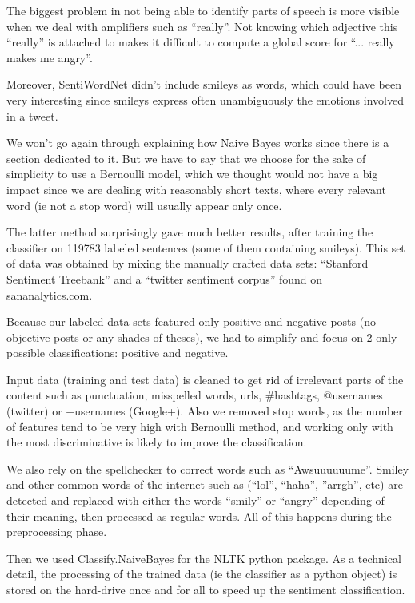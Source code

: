 The biggest problem in not being able to identify parts of speech is more visible when we deal with amplifiers
such as “really”. Not knowing which adjective this “really” is attached to makes it difficult to compute a global score for “... really makes me angry”.

Moreover, SentiWordNet didn’t include smileys as words, which could have been very interesting since smileys
express often unambiguously the emotions involved in a tweet.

We won’t go again through explaining how Naive Bayes works since there is a section dedicated to it. But we have
to say that we choose for the sake of simplicity to use a Bernoulli model, which we thought would not have a big
impact since we are dealing with reasonably short texts, where every relevant word (ie not a stop word) will usually appear only once.

The latter method surprisingly gave much better results, after training the classifier on 119783 labeled
sentences (some of them containing smileys). This set of data was obtained by mixing the manually crafted data sets:
“Stanford Sentiment Treebank” and a “twitter sentiment corpus” found on sananalytics.com.

Because our labeled data sets featured only positive and negative posts (no objective posts or any shades of theses),
we had to simplify and focus on 2 only possible classifications: positive and negative.

Input data (training and test data) is cleaned to get rid of irrelevant parts of the content such as punctuation,
misspelled words, urls, \#hashtags, @usernames (twitter) or +usernames (Google+). Also we removed stop words, as the
number of features tend to be very high with Bernoulli method, and working only with the most discriminative is likely
to improve the classification.

We also rely on the spellchecker to correct words such as “Awsuuuuuume”. Smiley and other common words of the internet
such as (“lol”, “haha”, ”arrgh”, etc) are detected and replaced with either the words “smily” or “angry” depending of their
meaning, then processed as regular words. All of this happens during the preprocessing phase.

Then we used Classify.NaiveBayes for the NLTK python package. As a technical detail, the processing of the trained data
(ie the classifier as a python object) is stored on the hard-drive once and for all to speed up the sentiment classification.

